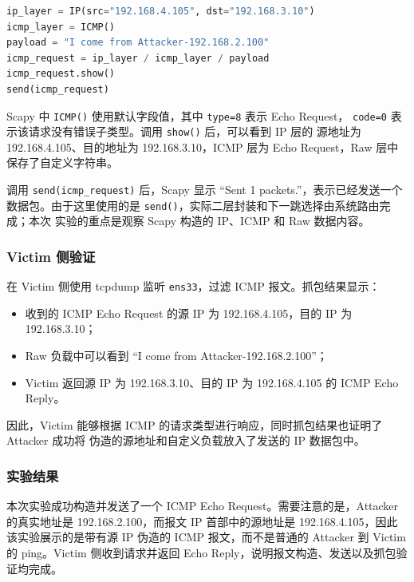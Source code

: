 \begin{lstlisting}[language=python,caption={使用 Scapy 构造 ICMP Echo Request}]
ip_layer = IP(src="192.168.4.105", dst="192.168.3.10")
icmp_layer = ICMP()
payload = "I come from Attacker-192.168.2.100"
icmp_request = ip_layer / icmp_layer / payload
icmp_request.show()
send(icmp_request)
\end{lstlisting}

Scapy 中 \texttt{ICMP()} 使用默认字段值，其中 \texttt{type=8} 表示 Echo Request，
\texttt{code=0} 表示该请求没有错误子类型。调用 \texttt{show()} 后，可以看到 IP 层的
源地址为 192.168.4.105、目的地址为 192.168.3.10，ICMP 层为 Echo Request，Raw 层中
保存了自定义字符串。


调用 \texttt{send(icmp\_request)} 后，Scapy 显示 ``Sent 1 packets.''，表示已经发送一个
数据包。由于这里使用的是 \texttt{send()}，实际二层封装和下一跳选择由系统路由完成；本次
实验的重点是观察 Scapy 构造的 IP、ICMP 和 Raw 数据内容。

\subsubsection{Victim 侧验证}

在 Victim 侧使用 tcpdump 监听 \texttt{ens33}，过滤 ICMP 报文。抓包结果显示：

\begin{itemize}
    \item 收到的 ICMP Echo Request 的源 IP 为 192.168.4.105，目的 IP 为 192.168.3.10；
    \item Raw 负载中可以看到 ``I come from Attacker-192.168.2.100''；
    \item Victim 返回源 IP 为 192.168.3.10、目的 IP 为 192.168.4.105 的 ICMP Echo Reply。
\end{itemize}

因此，Victim 能够根据 ICMP 的请求类型进行响应，同时抓包结果也证明了 Attacker 成功将
伪造的源地址和自定义负载放入了发送的 IP 数据包中。


\subsubsection{实验结果}

本次实验成功构造并发送了一个 ICMP Echo Request。需要注意的是，Attacker 的真实地址是
192.168.2.100，而报文 IP 首部中的源地址是 192.168.4.105，因此该实验展示的是带有源 IP
伪造的 ICMP 报文，而不是普通的 Attacker 到 Victim 的 ping。Victim 侧收到请求并返回
Echo Reply，说明报文构造、发送以及抓包验证均完成。

